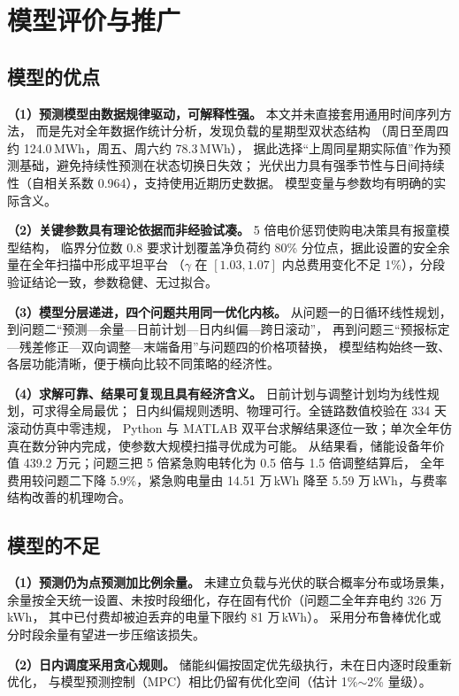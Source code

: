 \section{模型评价与推广}

\subsection{模型的优点}
\textbf{（1）预测模型由数据规律驱动，可解释性强。} 本文并未直接套用通用时间序列方法，
而是先对全年数据作统计分析，发现负载的星期型双状态结构
（周日至周四约 124.0\,MWh，周五、周六约 78.3\,MWh），
据此选择“上周同星期实际值”作为预测基础，避免持续性预测在状态切换日失效；
光伏出力具有强季节性与日间持续性（自相关系数 0.964），支持使用近期历史数据。
模型变量与参数均有明确的实际含义。

\textbf{（2）关键参数具有理论依据而非经验试凑。} 5 倍电价惩罚使购电决策具有报童模型结构，
临界分位数 0.8 要求计划覆盖净负荷约 80\% 分位点，据此设置的安全余量在全年扫描中形成平坦平台
（$\gamma$ 在 $[1.03,1.07]$ 内总费用变化不足 1\%），分段验证结论一致，参数稳健、无过拟合。

\textbf{（3）模型分层递进，四个问题共用同一优化内核。} 从问题一的日循环线性规划，
到问题二“预测—余量—日前计划—日内纠偏—跨日滚动”，
再到问题三“预报标定—残差修正—双向调整—末端备用”与问题四的价格项替换，
模型结构始终一致、各层功能清晰，便于横向比较不同策略的经济性。

\textbf{（4）求解可靠、结果可复现且具有经济含义。} 日前计划与调整计划均为线性规划，可求得全局最优；
日内纠偏规则透明、物理可行。全链路数值校验在 334 天滚动仿真中零违规，
Python 与 MATLAB 双平台求解结果逐位一致；单次全年仿真在数分钟内完成，使参数大规模扫描寻优成为可能。
从结果看，储能设备年价值 439.2 万元；问题三把 5 倍紧急购电转化为 0.5 倍与 1.5 倍调整结算后，
全年费用较问题二下降 5.9\%，紧急购电量由 14.51 万\,kWh 降至 5.59 万\,kWh，与费率结构改善的机理吻合。

\subsection{模型的不足}
\textbf{（1）预测仍为点预测加比例余量。} 未建立负载与光伏的联合概率分布或场景集，
余量按全天统一设置、未按时段细化，存在固有代价（问题二全年弃电约 326 万\,kWh，
其中已付费却被迫丢弃的电量下限约 81 万\,kWh）。
采用分布鲁棒优化\cite{bertsimas2013}或分时段余量有望进一步压缩该损失。

\textbf{（2）日内调度采用贪心规则。} 储能纠偏按固定优先级执行，未在日内逐时段重新优化，
与模型预测控制（MPC）\cite{mayne2000}相比仍留有优化空间（估计 1\%$\sim$2\% 量级）。


